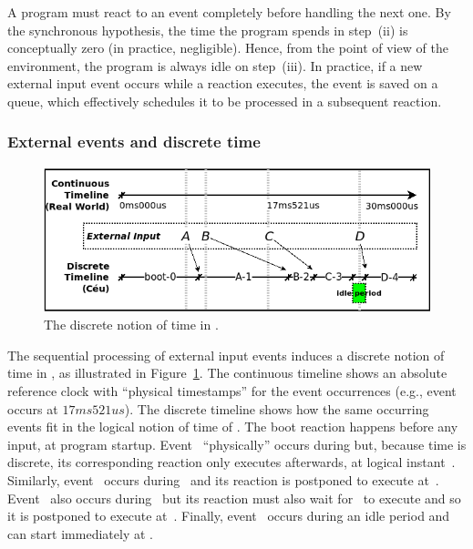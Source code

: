 A program must react to an event completely before handling the next one.
%
By the synchronous hypothesis, the time the program spends in step~(ii) is
conceptually zero (in practice, negligible).
%
Hence, from the point of view of the environment, the program is always
idle on step~(iii).
%
In practice, if a new external input event occurs while a reaction executes,
the event is saved on a queue, which effectively schedules it to be processed
in a subsequent reaction.

\subsubsection*{External events and discrete time}

\begin{figure}[b]
\centering
\includegraphics[width=\columnwidth]{tick_min}
\caption{The discrete notion of time in \CEU.}
\label{fig.ticks}
\end{figure}

The sequential processing of external input events induces a discrete notion of
time in \CEU, as illustrated in Figure~\ref{fig.ticks}.
%
The continuous timeline shows an absolute reference clock with ``physical
timestamps'' for the event occurrences (e.g., event~ occurs at
$17ms521us$).
%
The discrete timeline shows how the same occurring events fit in the logical
notion of time of \CEU.
%
The boot reaction  happens before any input, at program startup.
%
Event~ ``physically'' occurs during  but, because time
is discrete, its corresponding reaction only executes afterwards, at logical
instant~.
%
Similarly, event~ occurs during~ and its reaction is
postponed to execute at~.
%
Event~ also occurs during~ but its reaction must also wait
for~ to execute and so it is postponed to execute at~.
%
Finally, event~ occurs during an idle period and can start immediately
at .
%

